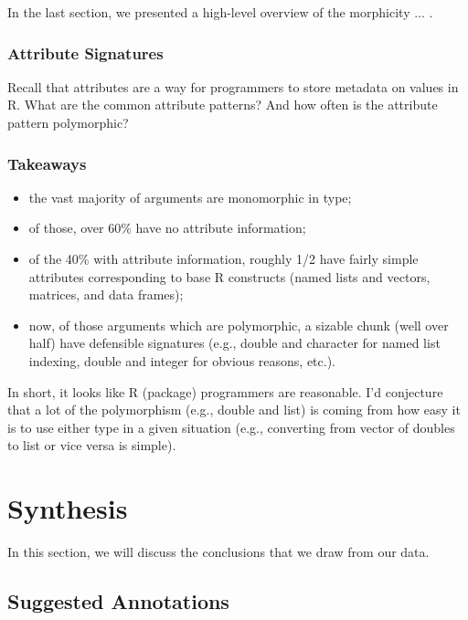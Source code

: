 In the last section, we presented a high-level overview of the morphicity ... .

\subsubsection{Attribute Signatures}

Recall that attributes are a way for programmers to store metadata on values in R.
What are the common attribute patterns?
And how often is the attribute pattern polymorphic?

\subsubsection{Takeaways}

\begin{itemize}
    \item the vast majority of arguments are monomorphic in type;
    \item of those, over 60\% have no attribute information;
    \item of the 40\% with attribute information, roughly 1/2 have fairly simple attributes corresponding to base R constructs (named lists and vectors, matrices, and data frames);
    \item now, of those arguments which are polymorphic, a sizable chunk (well over half) have defensible signatures (e.g., double and character for named list indexing, double and integer for obvious reasons, etc.).
\end{itemize}

In short, it looks like R (package) programmers are reasonable.
I'd conjecture that a lot of the polymorphism (e.g., double and list) is coming from how easy it is to use either type in a given situation (e.g., converting from vector of doubles to list or vice versa is simple).

%
%
%
%
%
%
\section{Synthesis}

In this section, we will discuss the conclusions that we draw from our data.

%
%
%
%
\subsection{Suggested Annotations}


